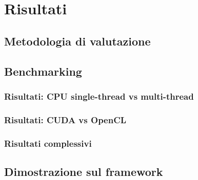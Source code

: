 \chapter{Risultati}
\label{ch:risultati}

\section{Metodologia di valutazione}
\label{sec:bencharmking}

\lipsum[1]

\section{Benchmarking}
\label{sec:benchmarking}

\lipsum[1]

\subsection{Risultati: CPU single-thread vs multi-thread}
\label{subsec:risultati-cpu}

\lipsum[1]

\subsection{Risultati: CUDA vs OpenCL}
\label{subsec:risultati-cuda-opencl}

\lipsum[1]

\subsection{Risultati complessivi}
\label{subsec:risultati-complessivi}

\lipsum[1]

\section{Dimostrazione sul framework}
\label{sec:dimostrazione}

\lipsum[1]
